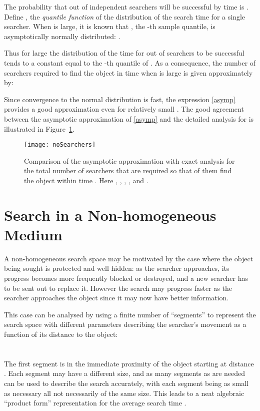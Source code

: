 \documentclass[journal]{IEEEtran}
\begin{document}
The probability that  out of  independent searchers will be successful by time  is . Define , the {\em quantile function} of the distribution of the search time for a single searcher. When  is large, it is known that , the -th sample quantile, is asymptotically normally distributed: .

Thus for large  the distribution of the time for  out of  searchers to be successful tends to a constant equal to the -th quantile of . As a consequence, the number of searchers  required to find the object in time  when  is large is given approximately by:

Since convergence to the normal distribution is fast, the expression \eqref{asymp} provides a good approximation even for relatively small . The good agreement between the asymptotic approximation of \eqref{asymp} and the
detailed analysis for  is illustrated in Figure~\ref{noSearchers}.

\begin{figure}[t]\centering
   \texttt{[image: noSearchers]}
   \caption{Comparison of the asymptotic approximation with exact analysis for the total number of searchers  that are required so that  of them find the object within time . Here , , , ,  and . } \label{noSearchers}
\end{figure}




\section{Search in a Non-homogeneous Medium}\label{non-hom}

A non-homogeneous search space may be  motivated
by the case where the object being sought is protected and well hidden: as the searcher approaches, its progress becomes more frequently blocked or destroyed, and a new searcher has to be sent out to replace it. However the search may progress faster as the searcher approaches the object
since it may now have better information.

This case can be analysed by using a finite number of ``segments'' to represent the search space with  different parameters describing the searcher's movement as a function of its distance to the object:\\
\\
\\
The first segment is in the immediate proximity of the object starting at distance . Each segment may have a different size, and  as many segments as are needed can be used to describe the search accurately, with each segment being as small as necessary all not necessarily of the same size. This leads to a neat algebraic ``product form'' representation for the average search time \cite{CJ-diffusion2012}.
\end{document}
